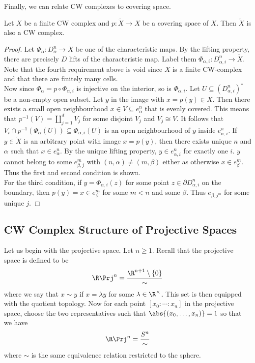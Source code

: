 \documentclass[a4paper]{article}
\begin{document}
Finally, we can relate CW complexes to covering space. 

\begin{prp}{}{} Let $X$ be a finite CW complex and $p:\widetilde{X}\to X$ be a covering space of $X$. Then $\widetilde{X}$ is also a CW complex. 
\begin{proof}
Let $\Phi_\alpha:D_\alpha^n\to X$ be one of the characteristic maps. By the lifting property, there are precisely $D$ lifts of the characteristic map. Label them $\Phi_{\alpha,i}:D_{\alpha,i}^n\to\widetilde{X}$. Note that the fourth requirement above is void since $X$ is a finite CW-complex and that there are finitely many cells. \\

Now since $\Phi_{\alpha}=p\circ\Phi_{\alpha,i}$ is injective on the interior, so is $\Phi_{\alpha,i}$. Let $U\subseteq(D_{\alpha,i}^n)^\circ$ be a non-empty open subset. Let $y$ in the image with $x=p(y)\in X$. Then there exists a small open neighbourhood $x\in V\subseteq e_\alpha^n$ that is evenly covered. This means that $p^{-1}(V)=\coprod_{j=1}^dV_j$ for some disjoint $V_j$ and $V_j\cong V$. It follows that $V_i\cap p^{-1}(\Phi_\alpha(U))\subseteq\Phi_{\alpha,i}(U)$ is an open neighbourhood of $y$ inside $e_{\alpha,i}^n$. If $y\in\widetilde{X}$ is an arbitrary point with image $x=p(y)$, then there exists unique $n$ and $\alpha$ such that $x\in e_{\alpha}^n$. By the unique lifting property, $y\in e_{\alpha,i}^n$ for exactly one $i$. $y$ cannot belong to some $e_{\beta,j}^m$ with $(n,\alpha)\neq(m,\beta)$ either as otherwise $x\in e_\beta^m$. Thus the first and second condition is shown. \\

For the third condition, if $y=\Phi_{\alpha,i}(z)$ for some point $z\in\partial D_{\alpha,i}^n$ on the boundary, then $p(y)=x\in e_\beta^m$ for some $m<n$ and some $\beta$. Thus $e_{\beta,j^m}$ for some unique $j$. 
\end{proof}
\end{prp}

\subsection{CW Complex Structure of Projective Spaces}
Let us begin with the projective space. Let $n\geq 1$. Recall that the projective space is defined to be $$\R\Prj^n=\frac{\R^{n+1}\setminus\{0\}}{\sim}$$ where we say that $x\sim y$ if $x=\lambda y$ for some $\lambda\in\R^\times$. This set is then equipped with the quotient topology. Now for each point $[x_0:\cdots:x_n]$ in the projective space, choose the two representatives such that $\abs{(x_0,\dots,x_n)}=1$ so that we have $$\R\Prj^n=\frac{S^n}{\sim}$$ where $\sim$ is the same equivalence relation restricted to the sphere. 
\end{document}
